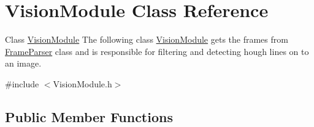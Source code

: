 \hypertarget{classVisionModule}{}\section{Vision\+Module Class Reference}
\label{classVisionModule}


Class \hyperlink{classVisionModule}{Vision\+Module} The following class \hyperlink{classVisionModule}{Vision\+Module} gets the frames from \hyperlink{classFrameParser}{Frame\+Parser} class and is responsible for filtering and detecting hough lines on to an image.  




{\ttfamily \#include $<$Vision\+Module.\+h$>$}

\subsection*{Public Member Functions}
